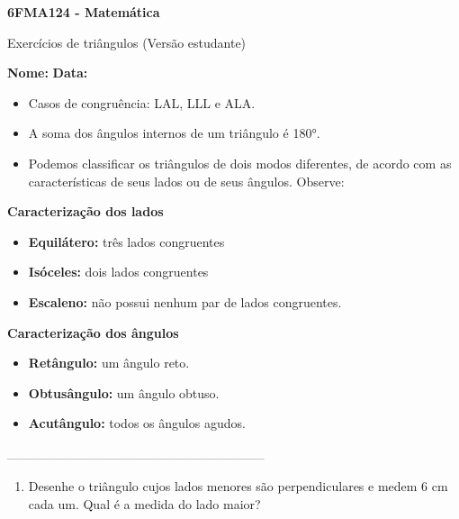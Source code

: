 \documentclass[a4paper,14pt]{article}
\begin{document}
	
	\noindent\textbf{6FMA124 - Matemática} 
	
	\begin{center}Exercícios de triângulos (Versão estudante)
	\end{center}
	
	\noindent\textbf{Nome:} \underline{\hspace{10cm}}
	\noindent\textbf{Data:} \underline{\hspace{4cm}}
	
	
	\begin{multicols}{2}
	    \noindent \begin{itemize}
	    	\item Casos de congruência: LAL, LLL e ALA.
	    	\item A soma dos ângulos internos de um triângulo é 180°.
	    	\item Podemos classificar os triângulos de dois modos diferentes, de acordo com as características de seus lados ou de seus ângulos. Observe:
	    \end{itemize}
	    \textbf{Caracterização dos lados}
	    \begin{itemize}
	    	\item \textbf{Equilátero:} três lados congruentes
	    	\item \textbf{Isóceles:} dois lados congruentes
	    	\item \textbf{Escaleno:} não possui nenhum par de lados congruentes.
	    \end{itemize}
	     \textbf{Caracterização dos ângulos}
	    \begin{itemize}
	    	\item \textbf{Retângulo:} um ângulo reto.
	    	\item \textbf{Obtusângulo:} um ângulo obtuso.
	    	\item \textbf{Acutângulo:} todos os ângulos agudos.
	    \end{itemize}
		\noindent\textsubscript{--------------------------------------------------------------------------}
		\begin{enumerate} 
			\columnbreak
			\item Desenhe o triângulo cujos lados menores são perpendiculares e medem 6 cm cada um. Qual é a medida do lado maior? \\\\\\\\\\\\\\\\\\\\\\\\

\end{enumerate}
\end{multicols}
\end{document}
